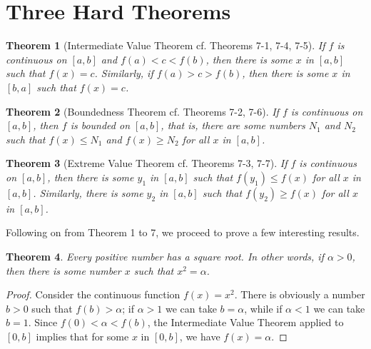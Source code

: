 \documentclass{article}
\numberwithin{corollary}{subsection}
\numberwithin{definition}{subsection}
\numberwithin{lemma}{subsection}
\newtheorem{theorem}{Theorem}
\numberwithin{theorem}{subsection}
\begin{document}
\section{Three Hard Theorems}

\begin{theorem}[Intermediate Value Theorem cf. Theorems 7-1, 7-4, 7-5]
  If $f$ is continuous on $[a, b]$ and $f(a) < c < f(b)$, then there is some
  $x$ in $[a, b]$ such that $f(x) = c$. Similarly, if $f(a) > c > f(b)$, then
  there is some $x$ in $[b, a]$ such that $f(x) = c$.
\end{theorem}

\begin{theorem}[Boundedness Theorem cf. Theorems 7-2, 7-6]
  If $f$ is continuous on $[a, b]$, then $f$ is bounded on $[a, b]$, that
  is, there are some numbers $N_1$ and $N_2$ such that $f(x) \leq N_1$ and
  $f(x) \geq N_2$ for all $x$ in $[a, b]$.
\end{theorem}

\begin{theorem}[Extreme Value Theorem cf. Theorems 7-3, 7-7]
  If $f$ is continuous on $[a, b]$, then there is some $y_1$ in $[a, b]$ such
  that $f(y_1) \leq f(x)$ for all $x$ in $[a, b]$. Similarly, there is some
  $y_2$ in $[a, b]$ such that $f(y_2) \geq f(x)$ for all $x$ in $[a, b]$.
\end{theorem}

Following on from Theorem 1 to 7, we proceed to prove a few interesting
results.

\setcounter{theorem}{7}
\begin{theorem}
  Every positive number has a square root. In other words, if $\alpha > 0$,
  then there is some number $x$ such that $x^2 = \alpha$.
\end{theorem}
\begin{proof}
  Consider the continuous function $f(x) = x^2$. There is obviously a number $b
  > 0$ such that $f(b) > \alpha$; if $\alpha > 1$ we can take $b = \alpha$,
  while if $\alpha < 1$ we can take $b = 1$. Since $f(0) < \alpha < f(b)$, the
  Intermediate Value Theorem applied to $[0, b]$ implies that for some $x$ in
  $[0, b]$, we have $f(x) = \alpha$.
\end{proof}
\end{document}
